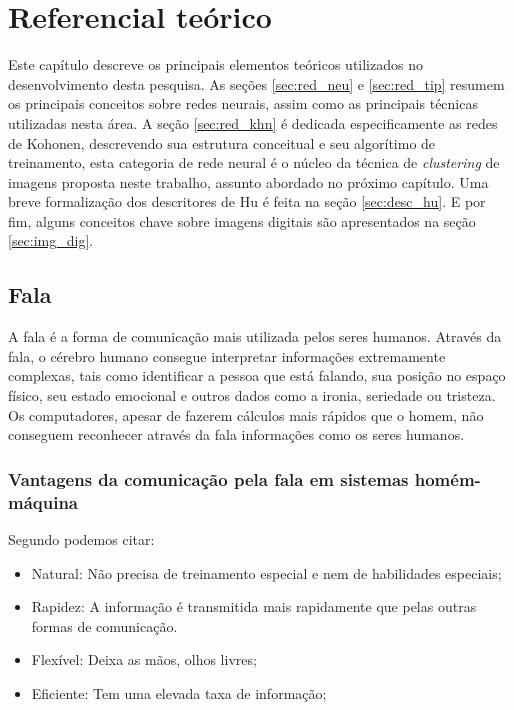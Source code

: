 \chapter{Referencial teórico}

Este capítulo descreve os principais elementos teóricos utilizados no
desenvolvimento desta pesquisa. As seções \ref{sec:red_neu} e \ref{sec:red_tip}
resumem os principais conceitos sobre redes neurais, assim como as principais
técnicas utilizadas nesta área. A seção \ref{sec:red_khn} é dedicada
especificamente as redes de Kohonen, descrevendo sua estrutura conceitual e seu
algorítimo de treinamento, esta categoria de rede neural é o núcleo da técnica
de \textit{clustering} de imagens proposta neste trabalho, assunto abordado no
próximo capítulo. Uma breve formalização dos descritores de Hu é feita na seção
\ref{sec:desc_hu}. E por fim, alguns conceitos chave sobre imagens digitais são
apresentados na seção \ref{sec:img_dig}.

\section{Fala}
A fala é a forma de comunicação mais utilizada pelos seres humanos.\cite{RvPatrick} Através da fala, o cérebro humano consegue interpretar informações extremamente complexas, tais como identificar a pessoa que está falando, sua posição no espaço físico, seu estado emocional e outros dados como a ironia, seriedade ou tristeza. Os computadores, apesar de fazerem cálculos mais rápidos que o homem, não conseguem reconhecer através da fala informações como os seres humanos.

\subsection{Vantagens da comunicação pela fala em sistemas homém-máquina}

Segundo \cite{RavDigitalSadaoki} podemos citar:

\begin{itemize}
\item Natural: Não precisa de treinamento especial e nem de habilidades especiais;
\item Rapidez: A informação é transmitida mais rapidamente que pelas outras formas de comunicação.
\item Flexível: Deixa as mãos, olhos livres;
\item Eficiente: Tem uma elevada taxa de informação;
\end{itemize}

